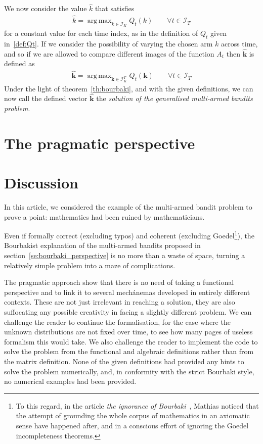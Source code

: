 \documentclass[]{scrartcl}
\DeclareMathOperator*{\argmax}{arg\,max}
\begin{document}
We now consider the value $\hat{k}$ that satisfies
\begin{align*}
\hat{k} = \argmax_{k \in \mathcal{I}_K} Q_t(k)
\qquad
\forall t \in \mathcal{I}_T
\end{align*}
for a constant value for each time index, as in the definition of $Q_t$ given in~\ref{def:Qt}. 
If we consider the possibility of varying the chosen arm $k$ across time, and so if we are allowed to compare different images of the function $A_t$ then $\hat{\mathbf{k}}$ is defined as
\begin{align}\label{eq:bourbaki_solution}
\hat{\mathbf{k}} 
= 
\argmax_{\mathbf{k} \in \mathcal{I}_K^{T}} Q_t(\mathbf{k})
\qquad
\forall t \in \mathcal{I}_T
\end{align}
Under the light of theorem~\ref{th:bourbaki}, and with the given definitions, we can now call the defined vector $\hat{\mathbf{k}}$ the \emph{solution of the generalised multi-armed bandits problem}.

\section{The pragmatic perspective}
\label{se:pragmatic_perspective}


\section{Discussion}
\label{se:outro}
In this article, we considered the example of the multi-armed bandit problem to prove a point: mathematics had been ruined by mathematicians. 

Even if formally correct (excluding typos) and coherent (excluding Goedel\footnote{
    To this regard, in the article \emph{the ignorance of Bourbaki}~\cite{mathias1992ignorance}, Mathias noticed that the attempt of grounding the whole corpus of mathematics in an axiomatic sense have happened after, and in a conscious effort of ignoring the Goedel incompleteness theorems.
}), the Bourbakist explanation of the multi-armed bandits proposed in section~\ref{se:bourbaki_perspective} is no more than a waste of space, turning a relatively simple problem into a maze of complications.

The pragmatic approach show that there is no need of taking a functional perspective and to link it to several mechánemas developed in entirely different contexts. These are not just irrelevant in reaching a solution, they are also suffocating any possible creativity in facing a slightly different problem. We can challenge the reader to continue the formalisation, for the case where the unknown distributions are not fixed over time, to see how many pages of useless formalism this would take. We also challenge the reader to implement the code to solve the problem from the functional and algebraic definitions rather than from the matrix definition. None of the given definitions had provided any hints to solve the problem numerically, and, in conformity with the strict Bourbaki style, no numerical examples had been provided. 
\end{document}
